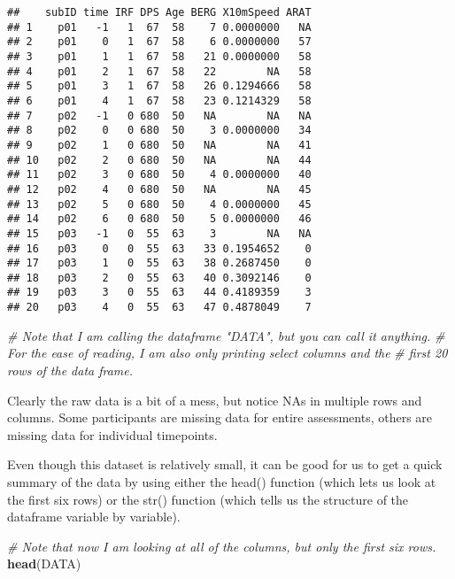 \documentclass[]{article}
\newenvironment{Shaded}{\begin{snugshade}}{\end{snugshade}}
\newcommand{\KeywordTok}[1]{\textcolor[rgb]{0.13,0.29,0.53}{\textbf{{#1}}}}
\newcommand{\CommentTok}[1]{\textcolor[rgb]{0.56,0.35,0.01}{\textit{{#1}}}}
\newcommand{\NormalTok}[1]{{#1}}
\begin{document}
\begin{verbatim}
##    subID time IRF DPS Age BERG X10mSpeed ARAT
## 1    p01   -1   1  67  58    7 0.0000000   NA
## 2    p01    0   1  67  58    6 0.0000000   57
## 3    p01    1   1  67  58   21 0.0000000   58
## 4    p01    2   1  67  58   22        NA   58
## 5    p01    3   1  67  58   26 0.1294666   58
## 6    p01    4   1  67  58   23 0.1214329   58
## 7    p02   -1   0 680  50   NA        NA   NA
## 8    p02    0   0 680  50    3 0.0000000   34
## 9    p02    1   0 680  50   NA        NA   41
## 10   p02    2   0 680  50   NA        NA   44
## 11   p02    3   0 680  50    4 0.0000000   40
## 12   p02    4   0 680  50   NA        NA   45
## 13   p02    5   0 680  50    4 0.0000000   45
## 14   p02    6   0 680  50    5 0.0000000   46
## 15   p03   -1   0  55  63    3        NA   NA
## 16   p03    0   0  55  63   33 0.1954652    0
## 17   p03    1   0  55  63   38 0.2687450    0
## 18   p03    2   0  55  63   40 0.3092146    0
## 19   p03    3   0  55  63   44 0.4189359    3
## 20   p03    4   0  55  63   47 0.4878049    7
\end{verbatim}

\begin{Shaded}
\begin{Highlighting}[]
\CommentTok{# Note that I am calling the dataframe "DATA", but you can call it anything.}
\CommentTok{# For the ease of reading, I am also only printing select columns and the }
\CommentTok{# first 20 rows of the data frame.}
\end{Highlighting}
\end{Shaded}

Clearly the raw data is a bit of a mess, but notice NAs in multiple rows
and columns. Some participants are missing data for entire assessments,
others are missing data for individual timepoints.

Even though this dataset is relatively small, it can be good for us to
get a quick summary of the data by using either the head() function
(which lets us look at the first six rows) or the str() function (which
tells us the structure of the dataframe variable by variable).

\begin{Shaded}
\begin{Highlighting}[]
\CommentTok{# Note that now I am looking at all of the columns, but only the first six rows.}
\KeywordTok{head}\NormalTok{(DATA)}
\end{Highlighting}
\end{Shaded}
\end{document}
